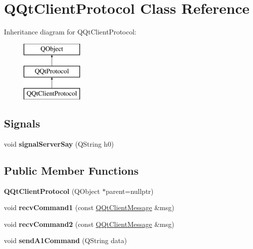 \hypertarget{class_q_qt_client_protocol}{}\section{Q\+Qt\+Client\+Protocol Class Reference}
\label{class_q_qt_client_protocol}
Inheritance diagram for Q\+Qt\+Client\+Protocol\+:\begin{figure}[H]
\begin{center}
\leavevmode
\includegraphics[height=3.000000cm]{class_q_qt_client_protocol}
\end{center}
\end{figure}
\subsection*{Signals}
\begin{DoxyCompactItemize}
\item 
\mbox{\label{class_q_qt_client_protocol_ae3f94e5c5b406213e87e76ffab76c256}} 
void {\bfseries signal\+Server\+Say} (Q\+String h0)
\end{DoxyCompactItemize}
\subsection*{Public Member Functions}
\begin{DoxyCompactItemize}
\item 
\mbox{\label{class_q_qt_client_protocol_adbbd794afdb169be6280a460dbcf2624}} 
{\bfseries Q\+Qt\+Client\+Protocol} (Q\+Object $\ast$parent=nullptr)
\item 
\mbox{\label{class_q_qt_client_protocol_a296a94000b2001be199f1bb87db15db0}} 
void {\bfseries recv\+Command1} (const \mbox{\hyperlink{class_q_qt_client_message}{Q\+Qt\+Client\+Message}} \&msg)
\item 
\mbox{\label{class_q_qt_client_protocol_a190e6ee13bb6ae284c7e46e0ea08dd3a}} 
void {\bfseries recv\+Command2} (const \mbox{\hyperlink{class_q_qt_client_message}{Q\+Qt\+Client\+Message}} \&msg)
\item 
\mbox{\label{class_q_qt_client_protocol_a26327d88893a383f2a9d0fb4623e9a84}} 
void {\bfseries send\+A1\+Command} (Q\+String data)
\end{DoxyCompactItemize}
